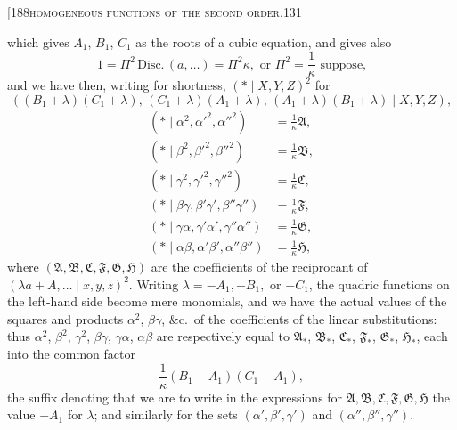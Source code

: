 \documentclass[11pt]{article}
\begin{document}
\begin{center}\small[188\hfill\textsc{homogeneous functions of the second order.}\hfill\textsc{131}\end{center}

\noindent which gives $A_{1}$, $B_{1}$, $C_{1}$ as the roots of a cubic equation, and gives also
\[
1 = \Pi^{2}\,\text{Disc.}\,(a,\ldots) = \Pi^{2}\kappa, \text{ or } \Pi^{2} = \frac{1}{\kappa} \text{ suppose,}
\]
and we have then, writing for shortness, $(*\mid X,Y,Z)^{2}$ for
\[
((B_{1}+\lambda)(C_{1}+\lambda),\,(C_{1}+\lambda)(A_{1}+\lambda),\,(A_{1}+\lambda)(B_{1}+\lambda)\mid X,Y,Z),
\]
\[
\begin{aligned}
(*\mid \alpha^{2},\alpha'^{2},\alpha''^{2}) &= \tfrac{1}{\kappa}\mathfrak{A},\\
(*\mid \beta^{2},\beta'^{2},\beta''^{2}) &= \tfrac{1}{\kappa}\mathfrak{B},\\
(*\mid \gamma^{2},\gamma'^{2},\gamma''^{2}) &= \tfrac{1}{\kappa}\mathfrak{C},\\
(*\mid \beta\gamma,\beta'\gamma',\beta''\gamma'') &= \tfrac{1}{\kappa}\mathfrak{F},\\
(*\mid \gamma\alpha,\gamma'\alpha',\gamma''\alpha'') &= \tfrac{1}{\kappa}\mathfrak{G},\\
(*\mid \alpha\beta,\alpha'\beta',\alpha''\beta'') &= \tfrac{1}{\kappa}\mathfrak{H},
\end{aligned}
\]
where $(\mathfrak{A},\mathfrak{B},\mathfrak{C},\mathfrak{F},\mathfrak{G},\mathfrak{H})$ are the coefficients of the reciprocant of $(\lambda a + A,\ldots\mid x,y,z)^{2}$.
Writing $\lambda = -A_{1}, -B_{1},$ or $-C_{1}$, the quadric functions on the left-hand side become
mere monomials, and we have the actual values of the squares and products $\alpha^{2}$, $\beta\gamma$,
\&c.\ of the coefficients of the linear substitutions: thus $\alpha^{2}$, $\beta^{2}$, $\gamma^{2}$, $\beta\gamma$, $\gamma\alpha$, $\alpha\beta$ are
respectively equal to $\mathfrak{A}_{*}$, $\mathfrak{B}_{*}$, $\mathfrak{C}_{*}$, $\mathfrak{F}_{*}$, $\mathfrak{G}_{*}$, $\mathfrak{H}_{*}$, each into the common factor
\[
\frac{1}{\kappa}(B_{1}-A_{1})(C_{1}-A_{1}),
\]
the suffix denoting that we are to write in the expressions for $\mathfrak{A}, \mathfrak{B}, \mathfrak{C}, \mathfrak{F}, \mathfrak{G}, \mathfrak{H}$ the
value $-A_{1}$ for $\lambda$; and similarly for the sets $(\alpha',\beta',\gamma')$ and $(\alpha'',\beta'',\gamma'')$.
\end{document}
